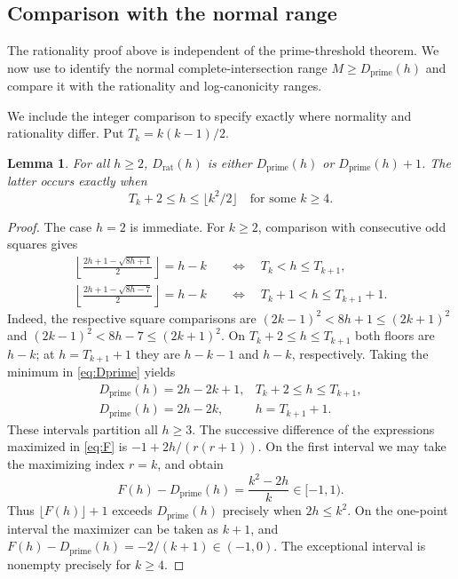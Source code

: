 \documentclass[11pt]{article}
\numberwithin{equation}{section}
\newtheorem{lemma}[theorem]{Lemma}
\theoremstyle{remark}
\newcommand{\Dprime}{D_{\mathrm{prime}}}
\newcommand{\Drat}{D_{\mathrm{rat}}}
\begin{document}
\subsection{Comparison with the normal range}
The rationality proof above is independent of the prime-threshold
theorem. We now use \cite[Theorems 1--2]{CS} to identify the normal
complete-intersection range $M\ge\Dprime(h)$ and compare it with
the rationality and log-canonicity ranges.


We include the integer comparison to specify exactly where
normality and rationality differ. Put $T_k=k(k-1)/2$.

\begin{lemma}\label{lem:arithmetic}
For all $h\ge2$, $\Drat(h)$ is either $\Dprime(h)$ or
$\Dprime(h)+1$. The latter occurs exactly when
\begin{equation}\label{eq:exception}
 T_k+2\le h\le\lfloor k^2/2\rfloor
 \quad\text{for some } k\ge4 .
\end{equation}
\end{lemma}
\begin{proof}
The case $h=2$ is immediate. For $k\ge2$, comparison with
consecutive odd squares gives
\begin{align*}
 \left\lfloor\frac{2h+1-\sqrt{8h+1}}2\right\rfloor=h-k
 &\quad\Longleftrightarrow\quad T_k<h\le T_{k+1},\\
 \left\lfloor\frac{2h+1-\sqrt{8h-7}}2\right\rfloor=h-k
 &\quad\Longleftrightarrow\quad T_k+1<h\le T_{k+1}+1.
\end{align*}
Indeed, the respective square comparisons are
$(2k-1)^2<8h+1\le(2k+1)^2$ and
$(2k-1)^2<8h-7\le(2k+1)^2$.
On $T_k+2\le h\le T_{k+1}$ both floors are $h-k$; at
$h=T_{k+1}+1$ they are $h-k-1$ and $h-k$, respectively.
Taking the minimum in \eqref{eq:Dprime} yields
\[
\begin{array}{ll}
 \Dprime(h)=2h-2k+1,&T_k+2\le h\le T_{k+1},\\
 \Dprime(h)=2h-2k,&h=T_{k+1}+1.
\end{array}
\]
These intervals partition all $h\ge3$.
The successive difference of the expressions maximized in
\eqref{eq:F} is $-1+2h/(r(r+1))$.
On the first interval we may take the maximizing index $r=k$,
and obtain
\[
 F(h)-\Dprime(h)=\frac{k^2-2h}{k}\in[-1,1).
\]
Thus $\lfloor F(h)\rfloor+1$ exceeds $\Dprime(h)$ precisely
when $2h\le k^2$. On the one-point interval the maximizer can
be taken as $k+1$, and
$F(h)-\Dprime(h)=-2/(k+1)\in(-1,0)$.
The exceptional interval is nonempty precisely for $k\ge4$.
\end{proof}
\end{document}
